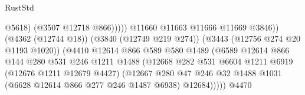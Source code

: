 \begin{lexlean}{RustStd}
\begin{coremodule}
                                                              @5618)
                                                            (@3507 @12718 @866)))))
                                                    @11660
                                                    @11663
                                                    @11666
                                                    @11669
                                                    @3846))
                                                (@4362 (@12744 @18))
                                                (@3840 (@12749 @219 @274))
                                                (@3443 (@12756 @274 @20 @1193 @1020))
                                                (@4410
                                                  @12614
                                                  @866
                                                  @589
                                                  @580
                                                  @1489
                                                  (@6589
                                                    @12614
                                                    @866
                                                    @144
                                                    @280
                                                    @531
                                                    @246
                                                    @1211
                                                    @1488
                                                    (@12668
                                                      @282
                                                      @531
                                                      @6604
                                                      @1211
                                                      @6919
                                                      (@12676 @1211 @12679 @4427)
                                                      (@12667
                                                        @280
                                                        @47
                                                        @246
                                                        @32
                                                        @1488
                                                        @1031
                                                        (@6628 @12614 @866 @277 @246 @1487 @6938)
                                                        @12684)))))
                                              @4470

\end{coremodule}
\end{lexlean}
